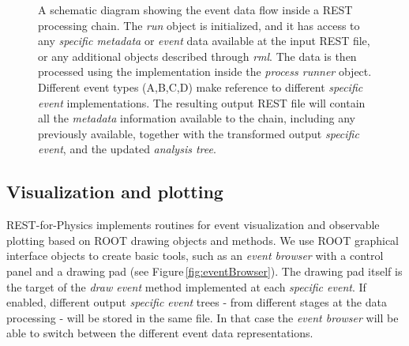 \begin{figure}[htb!]
  \centering
	\caption{A schematic diagram showing the event data flow inside a REST processing chain. The \emph{run} object is initialized, and it has access to any \emph{specific metadata} or \emph{event} data available at the input REST file, or any additional objects described through \emph{rml}. The data is then processed using the implementation inside the \emph{process runner} object. Different event types (A,B,C,D) make reference to different \emph{specific event} implementations. The resulting output REST file will contain all the \emph{metadata} information available to the chain, including any previously available, together with the transformed output \emph{specific event}, and the updated \emph{analysis tree}.  }\label{fig:processing}
\end{figure}

\subsection{Visualization and plotting}

REST-for-Physics implements routines for event visualization and observable plotting based on ROOT drawing objects and methods. We use ROOT graphical interface objects to create basic tools, such as an \emph{event browser} with a control panel and a drawing pad (see Figure\,\ref{fig:eventBrowser}). The drawing pad itself is the target of the \emph{draw event} method implemented at each \emph{specific event}. If enabled, different output \emph{specific event} trees - from different stages at the data processing - will be stored in the same file. In that case the \emph{event browser} will be able to switch between the different event data representations.

